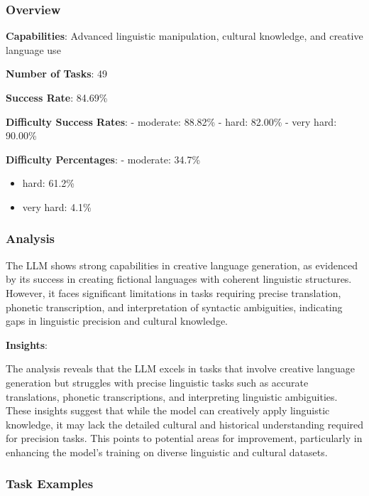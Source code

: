 \documentclass[fleqn,10pt]{wlscirep}
\begin{document}
\hypertarget{overview-6}{%
\subsubsection{Overview}\label{overview-6}}

\textbf{Capabilities}: Advanced linguistic manipulation, cultural
knowledge, and creative language use

\textbf{Number of Tasks}: 49

\textbf{Success Rate}: 84.69\%

\textbf{Difficulty Success Rates}: - moderate: 88.82\% - hard: 82.00\% -
very hard: 90.00\%

\textbf{Difficulty Percentages}: - moderate: 34.7\%

\begin{itemize}
\item
  hard: 61.2\%
\item
  very hard: 4.1\%
\end{itemize}

\hypertarget{analysis-5}{%
\subsubsection{Analysis}\label{analysis-5}}

The LLM shows strong capabilities in creative language generation, as
evidenced by its success in creating fictional languages with coherent
linguistic structures. However, it faces significant limitations in
tasks requiring precise translation, phonetic transcription, and
interpretation of syntactic ambiguities, indicating gaps in linguistic
precision and cultural knowledge.

\textbf{Insights}:

The analysis reveals that the LLM excels in tasks that involve creative
language generation but struggles with precise linguistic tasks such as
accurate translations, phonetic transcriptions, and interpreting
linguistic ambiguities. These insights suggest that while the model can
creatively apply linguistic knowledge, it may lack the detailed cultural
and historical understanding required for precision tasks. This points
to potential areas for improvement, particularly in enhancing the
model's training on diverse linguistic and cultural datasets.

\hypertarget{task-examples-5}{%
\subsubsection{Task Examples}\label{task-examples-5}}
\end{document}
